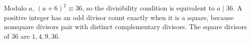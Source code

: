 Modulo $a$, $(a+6)^2\equiv36$, so the divisibility condition is equivalent to $a\mid36$. A positive integer has an odd divisor count exactly when it is a square, because nonsquare divisors pair with distinct complementary divisors. The square divisors of $36$ are $\boxed{1,4,9,36}$.
